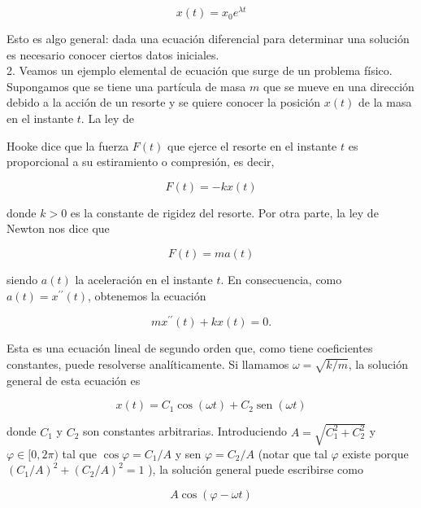 \documentclass[10pt]{book}
\begin{document}
$$
x(t)=x_{0} e^{\lambda t}
$$

Esto es algo general: dada una ecuación diferencial para determinar una solución es necesario conocer ciertos datos iniciales.\\
2. Veamos un ejemplo elemental de ecuación que surge de un problema físico. Supongamos que se tiene una partícula de masa $m$ que se mueve en una dirección debido a la acción de un resorte y se quiere conocer la posición $x(t)$ de la masa en el instante $t$. La ley de

Hooke dice que la fuerza $F(t)$ que ejerce el resorte en el instante $t$ es proporcional a su estiramiento o compresión, es decir,

$$
F(t)=-k x(t)
$$

donde $k>0$ es la constante de rigidez del resorte. Por otra parte, la ley de Newton nos dice que

$$
F(t)=m a(t)
$$

siendo $a(t)$ la aceleración en el instante $t$. En consecuencia, como $a(t)=x^{\prime \prime}(t)$, obtenemos la ecuación

$$
m x^{\prime \prime}(t)+k x(t)=0 .
$$

Esta es una ecuación lineal de segundo orden que, como tiene coeficientes constantes, puede resolverse analíticamente. Si llamamos $\omega=\sqrt{k / m}$, la solución general de esta ecuación es

$$
x(t)=C_{1} \cos (\omega t)+C_{2} \operatorname{sen}(\omega t)
$$

donde $C_{1}$ y $C_{2}$ son constantes arbitrarias. Introduciendo $A=\sqrt{C_{1}^{2}+C_{2}^{2}}$ y $\varphi \in[0,2 \pi)$ tal que $\cos \varphi=C_{1} / A$ y sen $\varphi=C_{2} / A$ (notar que tal $\varphi$ existe porque $\left(C_{1} / A\right)^{2}+\left(C_{2} / A\right)^{2}=1$ ), la solución general puede escribirse como

$$
A \cos (\varphi-\omega t)
$$
\end{document}
